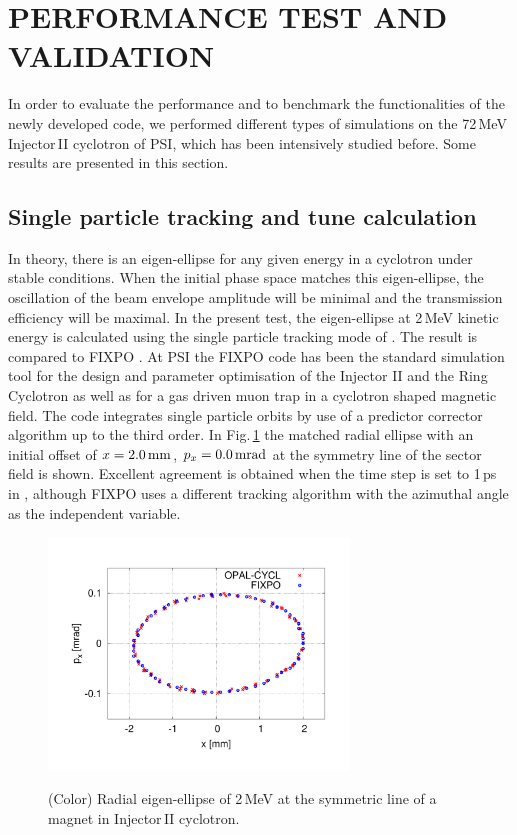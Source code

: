 \documentclass[aps,prstab,onecolumn,superscriptaddress,showpacs]{revtex4}
\begin{document}
\section{PERFORMANCE TEST AND VALIDATION}
In order to evaluate the performance and to benchmark the functionalities of the newly developed code, we performed different types of simulations on
 the 72\,MeV Injector\,II cyclotron of PSI, which has been intensively studied before. Some results are presented in this section. 

\subsection{Single particle tracking and tune calculation}
In theory, there is an eigen-ellipse for any given energy in a cyclotron under stable conditions. When the initial phase space
matches this eigen-ellipse, the oscillation of the beam envelope amplitude will be minimal and the transmission efficiency will be maximal.
In the present test, the eigen-ellipse at 2\,MeV kinetic energy is calculated using the single particle tracking mode of \opalcycl.  
The result is compared to FIXPO \cite{FIXPO:1,joho:2}.  
At PSI the FIXPO code has been the standard simulation tool for the 
design and parameter optimisation of the Injector II and the Ring Cyclotron as well as 
for a gas driven muon trap in a cyclotron shaped magnetic field.
The code integrates single particle orbits by use of a predictor corrector algorithm up to the third order.
In Fig.\,\ref{fig:Eigen} the matched radial ellipse with an initial offset of $x=2.0{\RM{\,mm}}$, $p_x=0.0{\RM{\,mrad}}$ at the symmetry line of the sector field is shown.
Excellent agreement is obtained when the time step is set to 1\,ps in \opalcycl, although FIXPO uses a different tracking algorithm with the azimuthal angle as
the independent variable.
\begin{figure}
  {\includegraphics[width=8cm,trim=2.5cm 2.5cm 2.5cm 2.5cm]{figures/RadialEigen_Inj2.pdf}}
  \caption{(Color) Radial eigen-ellipse of 2\,MeV at the symmetric line of a magnet in Injector\,II cyclotron.}
  \label{fig:Eigen}
\end{figure}
\end{document}
